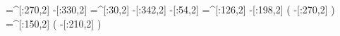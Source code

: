     =^[:270,2]%
     -[:330,2]%
     =^[:30,2]%
     -[:342,2]%
      -[:54,2]%
    =^[:126,2]%
     -[:198,2]%
                 (
         -[:270,2]%
                 )
    =^[:150,2]%
                 (
         -[:210,2]%
                 )